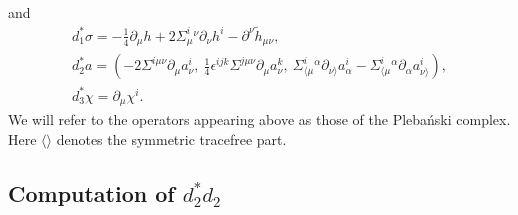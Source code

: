 \documentclass[10pt]{report}
\newcommand{\pleb}[0]{Pleba\'nski}
\theoremstyle{definition}
\begin{document}
and
\begin{align}\nonumber
d_1^* \sigma =   -\frac{1}{4}\partial_\mu h + 2\Sigma^i_\mu{}^\nu \partial_\nu h^i -  \partial^\nu \tilde{h}_{\mu\nu}, \\ \nonumber
d_2^* a = ( -2 \Sigma^{i\mu\nu} \partial_\mu a_\nu^i,\ \frac{1}{4} \epsilon^{ijk} \Sigma^{j\mu\nu} \partial_\mu a_\nu^k,\ \Sigma^i_{\langle\mu}{}^\alpha \partial_{\nu\rangle}a_\alpha^i-\Sigma^i_{\langle\mu}{}^\alpha \partial_\alpha a_{\nu\rangle}^i), \\ \nonumber
d_3^* \chi =   \partial_\mu \chi^i.
\end{align}
We will refer to the operators appearing above as those of the \pleb{} complex. Here $\langle \rangle$ denotes the symmetric tracefree part. 

\subsection{Computation of \texorpdfstring{$d_2^* d_2$}{}}
\end{document}
